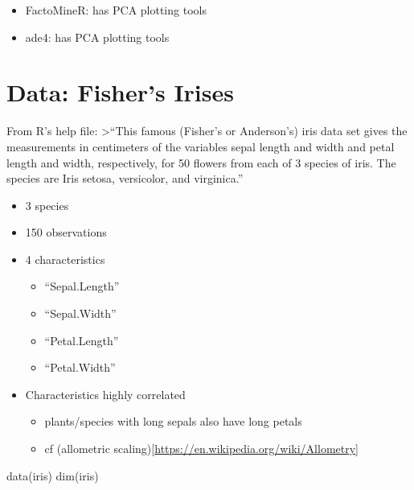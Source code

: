 \documentclass[
]{book}
\newenvironment{Shaded}{\begin{snugshade}}{\end{snugshade}}
\newcommand{\FunctionTok}[1]{\textcolor[rgb]{0.00,0.00,0.00}{#1}}
\newcommand{\NormalTok}[1]{#1}
\providecommand{\tightlist}{%
  \setlength{\itemsep}{0pt}\setlength{\parskip}{0pt}}
\begin{document}
\begin{itemize}
\tightlist
\item
  FactoMineR: has PCA plotting tools
\item
  ade4: has PCA plotting tools
\end{itemize}

\hypertarget{data-fishers-irises}{%
\section{Data: Fisher's Irises}\label{data-fishers-irises}}

From R's help file:
\textgreater{}``This famous (Fisher's or Anderson's) iris data set gives the measurements in centimeters of the variables sepal length and width and petal length and width, respectively, for 50 flowers from each of 3 species of iris. The species are Iris setosa, versicolor, and virginica.''

\begin{itemize}
\tightlist
\item
  3 species
\item
  150 observations
\item
  4 characteristics

  \begin{itemize}
  \tightlist
  \item
    ``Sepal.Length''
  \item
    ``Sepal.Width''\\
  \item
    ``Petal.Length''
  \item
    ``Petal.Width''\\
  \end{itemize}
\item
  Characteristics highly correlated

  \begin{itemize}
  \tightlist
  \item
    plants/species with long sepals also have long petals
  \item
    cf (allometric scaling){[}\url{https://en.wikipedia.org/wiki/Allometry}{]}
  \end{itemize}
\end{itemize}

\begin{Shaded}
\begin{Highlighting}[]
\FunctionTok{data}\NormalTok{(iris)}
\FunctionTok{dim}\NormalTok{(iris)}
\end{Highlighting}
\end{Shaded}
\end{document}
